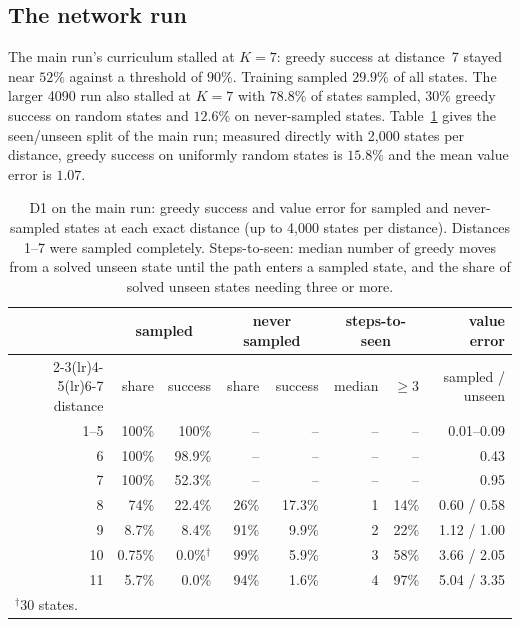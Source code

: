 \documentclass[11pt]{article}
\begin{document}
\subsection{The network run}

The main run's curriculum stalled at $K=7$: greedy success at distance~7 stayed near $52\%$
against a threshold of $90\%$. Training sampled $29.9\%$ of all states. The larger 4090 run also
stalled at $K=7$ with $78.8\%$ of states sampled, $30\%$ greedy success on random states and
$12.6\%$ on never-sampled states. Table~\ref{tab:seen} gives the seen/unseen split of the main
run; measured directly with 2{,}000 states per distance, greedy success on uniformly random
states is $15.8\%$ and the mean value error is $1.07$.

\begin{table}[t]
\centering\small
\caption{D1 on the main run: greedy success and value error for sampled and never-sampled
states at each exact distance (up to 4{,}000 states per distance). Distances 1--7 were sampled
completely. Steps-to-seen: median number of greedy moves from a solved unseen state until the
path enters a sampled state, and the share of solved unseen states needing three or more.}
\label{tab:seen}
\begin{tabular}{rrrrrrrr}
\toprule
& \multicolumn{2}{c}{sampled} & \multicolumn{2}{c}{never sampled} & \multicolumn{2}{c}{steps-to-seen} & value error \\
\cmidrule(lr){2-3}\cmidrule(lr){4-5}\cmidrule(lr){6-7}
distance & share & success & share & success & median & $\ge3$ & sampled / unseen \\
\midrule
1--5 & 100\% & 100\% & -- & -- & -- & -- & 0.01--0.09 \\
6  & 100\%  & 98.9\% & -- & -- & -- & -- & 0.43 \\
7  & 100\%  & 52.3\% & -- & -- & -- & -- & 0.95 \\
8  & 74\%   & 22.4\% & 26\%  & 17.3\% & 1 & 14\% & 0.60 / 0.58 \\
9  & 8.7\%  & 8.4\%  & 91\%  & 9.9\%  & 2 & 22\% & 1.12 / 1.00 \\
10 & 0.75\% & 0.0\%$^\dagger$ & 99\% & 5.9\% & 3 & 58\% & 3.66 / 2.05 \\
11 & 5.7\%  & 0.0\%  & 94\%  & 1.6\%  & 4 & 97\% & 5.04 / 3.35 \\
\bottomrule
\multicolumn{8}{l}{\footnotesize $^\dagger$30 states.}
\end{tabular}
\end{table}
\end{document}
